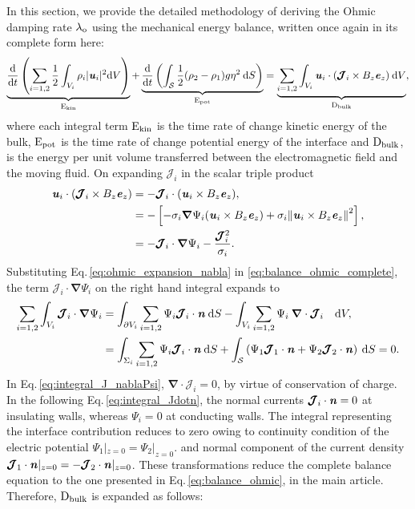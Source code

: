 \documentclass[aps,prfluids,reprint,superscriptaddress]{revtex4-2}
\newcommand{\h}[1]{\textbf{\textit{#1}}}
\newcommand{\nn}{\nonumber}
\newcommand{\meqref}[1]{{\hypersetup{linkcolor=black}\eqref{#1}}}
\numberwithin{equation}{section}
\begin{document}
In this section, we provide the detailed methodology of deriving the Ohmic damping rate $\lambda_{\rm o}$ using the mechanical energy balance, written once again in its complete form here:
\begin{equation}
	\underbrace{ \dv{}{t}\left( \sum_{i=1,2} \frac{1}{2} 
	\int_{V_i} \rho_i |\h u_i|^2 \mathrm dV  \right)
}_{\rm E_{kin}}
	+
	\underbrace{
	\dv{}{t}\left( \int_{\mathcal{S}} 
	\frac{1}{2} (\rho_2-\rho_1)g\eta^2  \: \mathrm dS  
	\right)
}_{\rm E_{pot}}
	= 
	\underbrace{
	\sum_{i=1,2}
	\int_{V_i} \h u_i \cdot (\pmb{\mathcal{J}}_i \times B_z\h e_z)\: \mathrm dV
}_{\rm D_{bulk}} ,
	\label{eq:balance_ohmic_complete}
\end{equation}
where each integral term $\rm E_{kin}$ is the time rate of change kinetic energy of the bulk, $\rm E_{pot}$ is the time rate of change potential energy of the interface and $\rm D_{bulk}$, is the energy per unit volume transferred between the electromagnetic field and the moving fluid. On expanding $\pmb{\mathcal{J}}_i$ in the scalar triple product
\begin{align} 
	\nn
	\h u_i \cdot (\pmb{\mathcal{J}}_i \times B_z\h e_z) 
	&= -\pmb{\mathcal{J}}_i \cdot ( \h u_i \times B_z\h e_z) ,
	\\ 
	\nn
	&= - \left[
	-\sigma_i\bm\nabla\Psi_i(\h u_i\times B_z\h e_z) 
	+ \sigma_i\norm{\h u_i \times B_z\h e_z}^2
	\right],
	\\
	& = -\pmb{\mathcal{J}}_i\cdot \bm\nabla\Psi_i - \frac{\pmb{\mathcal{J}}_i^2}{\sigma_i} .
	\label{eq:ohmic_expansion_nabla}
\end{align}
Substituting Eq.\,\eqref{eq:ohmic_expansion_nabla} in \eqref{eq:balance_ohmic_complete}, the term $\pmb{\mathcal{J}}_i\cdot \bm\nabla\Psi_i$ on the right hand integral expands to
\begin{align}
 \sum_{i=1,2} \int_{V_i} \pmb{\mathcal{J}}_i\cdot \bm\nabla\Psi_i
	&=
	\int_{\partial V_i} \sum_{i=1,2} \Psi_i \pmb{\mathcal J}_i \cdot \h n \mathrm \:\mathrm dS
	- \int_{V_i} \sum_{i=1,2} \Psi_i \:
	{\bm\nabla \cdot \pmb{\mathcal J}_i} \quad\mathrm dV,
	\label{eq:integral_J_nablaPsi}
	\\
	&= 
	\int_{\Sigma_i} \sum_{i=1,2} \Psi_i \pmb{\mathcal J}_i \cdot \h n \mathrm \:\mathrm dS
	+
	\int_{\mathcal{S}} 
	\left( \Psi_1 \pmb{\mathcal J}_1 \cdot \h n 
	+  \Psi_2 \pmb{\mathcal J}_2 \cdot \h n \right) \mathrm \:\mathrm dS = 0 .
	\label{eq:integral_Jdotn}
\end{align} 
In Eq.\,\eqref{eq:integral_J_nablaPsi}, $\bm\nabla \cdot \pmb{\mathcal J}_i = 0$, by virtue of conservation of charge. In the following Eq.\,\eqref{eq:integral_Jdotn}, the normal currents $\pmb{\mathcal J}_i \cdot \h n=0$ at insulating walls, whereas $\Psi_i=0$ at conducting walls. The integral representing the interface contribution reduces to zero owing to continuity condition of the electric potential $\Psi_1|_{z=0} = \Psi_2|_{z=0}$. and normal component of the current density $\pmb{\mathcal J}_1 \cdot \h n|_{z=0} = -\pmb{\mathcal J}_2 \cdot \h n|_{z=0}$. These transformations reduce the complete balance equation to the one presented in Eq.\,\meqref{eq:balance_ohmic}, in the main article. Therefore, $\rm D_{bulk}$ is expanded as follows:
\end{document}
